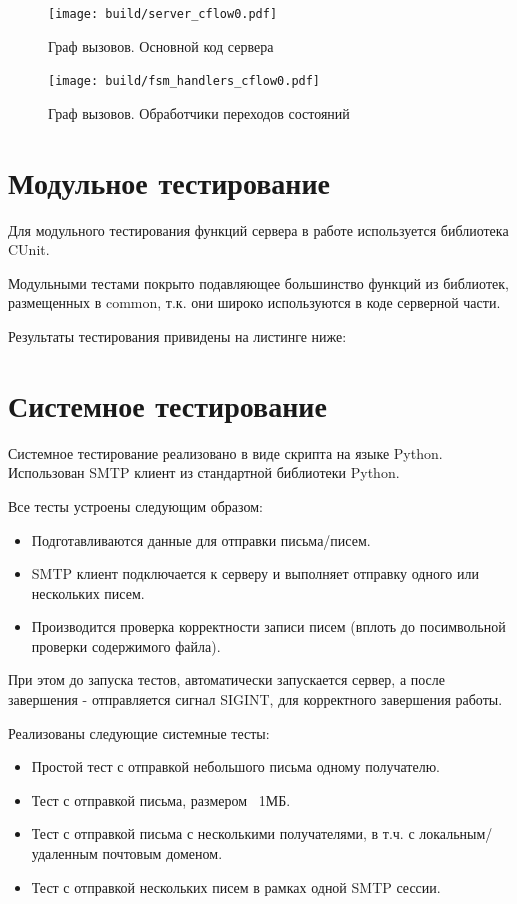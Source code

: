 \documentclass[a4paper,12pt]{report}
\begin{document}
\begin{figure}[H]
	\texttt{[image: build/server\_cflow0.pdf]}
	\caption{Граф вызовов. Основной код сервера}
	\label{fig:cflow2}
\end{figure}
\begin{figure}[H]
	\texttt{[image: build/fsm\_handlers\_cflow0.pdf]}
	\caption{Граф вызовов. Обработчики переходов состояний}
	\label{fig:cflow3}
\end{figure}

\newpage
\section{Модульное тестирование}
Для модульного тестирования функций сервера в работе используется библиотека CUnit.

Модульными тестами покрыто подавляющее большинство функций из библиотек, размещенных в common, т.к. они широко используются в коде серверной части.

Результаты тестирования привидены на листинге ниже: 


\section{Системное тестирование}
Системное тестирование реализовано в виде скрипта на языке Python. Использован SMTP клиент из стандартной библиотеки Python. 

Все тесты устроены следующим образом: 
\begin{itemize}
	\item Подготавливаются данные для отправки письма/писем. 
	\item SMTP клиент подключается к серверу и выполняет отправку одного или нескольких писем. 
	\item Производится проверка корректности записи писем (вплоть до посимвольной проверки содержимого файла).
\end{itemize}

При этом до запуска тестов, автоматически запускается сервер, а после завершения - отправляется сигнал SIGINT, для корректного завершения работы. 

Реализованы следующие системные тесты: 
\begin{itemize}
	\item Простой тест с отправкой небольшого письма одному получателю.  
	\item Тест с отправкой письма, размером ~1МБ.  
	\item Тест с отправкой письма с несколькими получателями, в т.ч. с локальным/удаленным почтовым доменом.
	\item Тест с отправкой нескольких писем в рамках одной SMTP сессии. 
\end{itemize}
\end{document}
